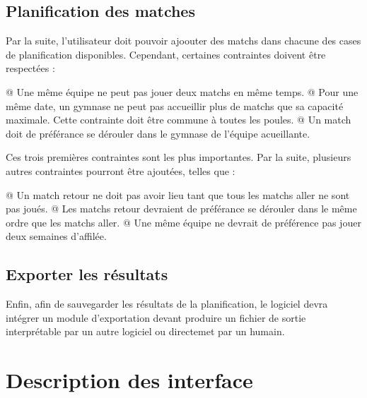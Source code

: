 \documentclass[final, noposter]{polytech/polytech}
\begin{document}
		\subsection{Planification des matches}
			Par la suite, l'utilisateur doit pouvoir ajoouter des matchs dans chacune des cases de planification disponibles. Cependant, certaines contraintes doivent être respectées :
			\begin{easylist}[itemize]
				@ Une même équipe ne peut pas jouer deux matchs en même temps.
				@ Pour une même date, un gymnase ne peut pas accueillir plus de matchs que sa capacité maximale. Cette contrainte doit être commune à toutes les poules.
				@ Un match doit de préférance se dérouler dans le gymnase de l'équipe acueillante.
			\end{easylist}
			Ces trois premières contraintes sont les plus importantes. Par la suite, plusieurs autres contraintes pourront être ajoutées, telles que :
			\begin{easylist}[itemize]
				@ Un match retour ne doit pas avoir lieu tant que tous les matchs aller ne sont pas joués.
				@ Les matchs retour devraient de préférance se dérouler dans le même ordre que les matchs aller.
				@ Une même équipe ne devrait de préférence pas jouer deux semaines d'affilée.
			\end{easylist}

		\subsection{Exporter les résultats}
			Enfin, afin de sauvegarder les résultats de la planification, le logiciel devra intégrer un module d'exportation devant produire un fichier de sortie interprétable par un autre logiciel ou directemet par un humain.

	\section{Description des interface}
		\label{sec:ui-design}
\end{document}
